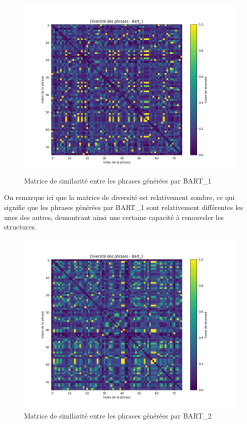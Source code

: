 \documentclass[11pt]{article}
\begin{document}
\vspace{5mm}

\begin{figure}[H]
\centering
\includegraphics[width=1\textwidth]{../plot/diversity_matrix_bart_1.png}
\caption{Matrice de similarité entre les phrases générées par BART\_1}
\end{figure}

\vspace{5mm}

On remarque ici que la matrice de diversité est relativement sombre, ce qui signifie que les phrases générées par BART\_1 sont relativement différentes les unes des autres, demontrant ainsi une certaine capacité à renouveler les structures.

\vspace{5mm}

\begin{figure}[H]
\centering
\includegraphics[width=1\textwidth]{../plot/diversity_matrix_bart_2.png}
\caption{Matrice de similarité entre les phrases générées par BART\_2}
\end{figure}
\end{document}
